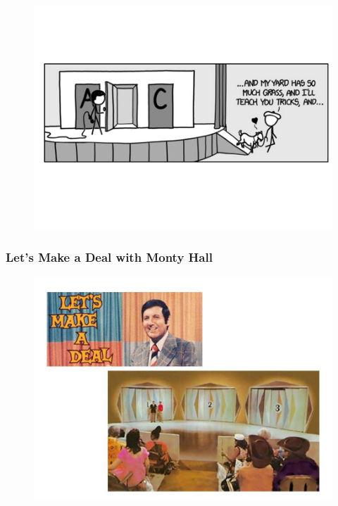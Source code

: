 \documentclass{beamer}
\begin{document}
\begin{frame}
\begin{figure}
\centering
\includegraphics[width=1.1\linewidth]{MontyHall/Slide1}


\end{figure}

\end{frame}
\begin{frame}
	\frametitle{Let's Make a Deal with Monty Hall}
	\begin{figure}
		\centering
		\includegraphics[width=0.99\linewidth]{MontyHall/Slide2}
		
	\end{figure}
	
\end{frame}
\end{document}
